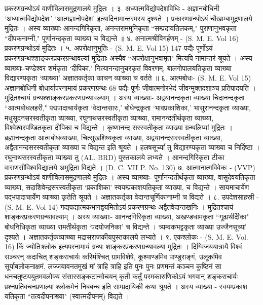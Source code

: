 प्रकरणग्रन्थोऽयं वाणीविलासमुद्रणालये मुद्रितः ।
३. अध्यात्मविद्योपदेशविधिः -
अज्ञानबोधिनी `अध्यात्मविद्योपदेशः' `आत्मज्ञानोपदेश' इत्यादिनामान्तरमस्य दृश्यते । प्रकारणग्रन्थोऽयं चौखाम्बामुद्रणालये मुद्रितः । अस्य व्याख्याः आनन्दगिरिकृता, अनन्तराममुनिकृता ``सम्प्रदायतिलकम्," पुराणानुभवकृता ``दीपकनाम्नी," पूर्णानन्दकृता व्याख्या च विद्यन्ते ॥
४. अनात्मश्रीविगर्हणम् - (S. M. E. Vol 16) प्रकरणग्रन्थोऽयं मुद्रितः ।
५. अपरोक्षानुभूतिः - (S. M. E. Vol 15)
147 पद्यैः पूर्णोऽयं प्रकरणग्रन्थश्शाङ्करप्रकरग्रन्थावल्यां मुद्रिताः अस्यैव ``अपरोक्षानुभवामृत" मित्यपि नामान्तरं श्रूयते । अस्य व्याख्याः-चण्डेश्वर शर्मकृता `दीपिका,' नित्यानन्दानुचरकृतं विवरणम्, बालगोपालयतिकृता व्याख्या विद्यारण्यकृता `व्याख्या' अज्ञातकर्तृका काचन व्याख्या च वर्तते ॥
६. आत्मबोधः- (S. M. E. Vol 15)
अज्ञानबोधिनी बोधार्यापरनामायं प्रकरणग्रन्थः 68 पद्यैः पूर्णः जीवात्मनोरभेदं जीवन्मुक्तदशाञ्च प्रतिपादयति । मुद्रितश्चायं ग्रन्थश्शाङ्करप्रकरणग्रन्थावल्याम् ।
अस्य व्याख्याः- अद्वयानन्दकृता व्याख्या चिदानन्दकृता ``आत्मबोधलहरी," पद्मपादाचार्यकृता `वेदान्तसारः,' बोधेन्द्रकृता `भावप्रकाशिका,' भासुरानन्दकृता व्याख्या, मधुसूदनसरस्वतीकृता व्याख्या, रघुनाथसरस्वतीकृता व्याख्या, रामानन्दतीर्थकृता व्याख्या, विश्वेश्वरपण्डितकृता दीपिका च विद्यन्ते । कृष्णानन्द सरस्वतीकृता व्याख्या ग्रन्थलिप्यां मुद्रितः । ब्रह्मानन्दकृता आत्मबोधव्याख्या, चित्सुखशिष्यकृता व्याख्या, अद्वयानन्दसरस्वतीकृता व्याख्या, अद्वैतानन्दसरस्वतीकृता व्याख्या च विद्यन्त इति श्रूयते । हलषसूच्यांं तु विद्यारण्यकृता व्याख्या च निर्दिष्टा । रघुनाथसरस्वतीकृता व्याख्या तु (AL. BRD) पुस्तकालये लभ्यते । आनन्दगिरिकृता टीका वाराणसीविश्वविद्यालये अमुद्रिता विद्यते । (D. C. VII P. No. 130)
७. आत्मानात्मविवेकः - (VVP)
प्रकरणग्रन्थोऽयं वाणीविलासमुद्रणालये मुद्रितः । अस्य व्याख्याः- पूर्णानन्दतीर्थकृता व्याख्या, वासुदेवयतिकृता व्याख्या, सदाशिवेन्द्रसरस्वतीकृता `प्रकाशिका' स्वयम्प्रकाशयतिकृता व्याख्या, च विद्यन्ते । सायमाचार्येण पद्भपादाचार्येण व्याख्या कृतेति श्रूयते । अज्ञातकर्तृका वेदान्तचूर्णिकानाम्नी च विद्यते ।
८. उपदेशसाहस्री - (S. M. E. Vol 14)
गद्यपद्यात्मकभागद्वयमितोऽयं प्रकरणग्रन्थः अद्वैतवेदान्तखनिः । मुद्रितश्चायं शाङ्करप्रकरणग्रन्थावल्याम् । अस्य व्याख्याः- आनन्दगिरिकृता व्याख्या, अखण्डधामकृता ``गूढार्थदीिका" बोधनिधिकृता व्याख्या रामतीर्थकृता `पदयोजनिका' च विद्यन्ते । त्र्यम्वकभट्टकृता व्याख्या उज्जैनसूच्यां दृश्यते । अज्ञातकर्तृकव्याख्या मद्रासराजकीयपुस्तकालये लभ्यते । 
९. एकश्लोकः - (S. M. E. Vol. 16)
किं ज्योतिःश्लोक इत्यपरनामायं ग्रन्थः शाङ्करप्रकरणग्रन्थावल्यां मुद्रितः । दिग्विजययात्रायै विश्वं सञ्चरन् कदाचित् शङ्कराचार्यः कस्मिंश्चित् ग्रामविशेषे, कूश्माण्डमिव पाण्डुराङ्गं, उलूकमिव सूर्याबलोकनाक्षमं, लज्जयावनतमुखं मां त्राहि त्राहि इति पुनः पुनः प्रणमन्तं कञ्चन कुष्ठिनं सा धनचतुष्टययुतमवलोक्य संसारसङ्कटान्मोचयन् कृती कर्तुं परमकारुणिकोऽयं भगवान् शङ्कराचार्यः प्रश्नप्रतिवचनप्रणाल्या श्लोकमेनं निबबन्ध इति साम्प्रदायिकी कथा श्रूयते । अस्य व्याख्या - स्वयम्प्रकाश यतिकृता ``तत्वदीपनाख्या" (स्वात्मदीपनम्) विद्यते ।
